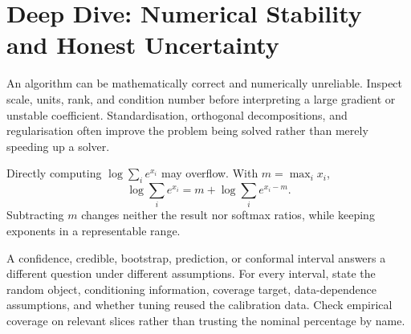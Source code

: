 \expandafter\def\csname almanachdeepdive@mathematics\endcsname{%
\section{Deep Dive: Numerical Stability and Honest Uncertainty}
\begin{tcbitemize}[skin=sectionraster]
\tcbitem[title={Conditioning Before Optimisation},raster multicolumn=3]
An algorithm can be mathematically correct and numerically unreliable.
Inspect scale, units, rank, and condition number before interpreting a large
gradient or unstable coefficient.
Standardisation, orthogonal decompositions, and regularisation often improve
the problem being solved rather than merely speeding up a solver.

\tcbitem[title={Log-Sum-Exp},raster multicolumn=3]
Directly computing $\log\sum_i e^{x_i}$ may overflow.
With $m=\max_i x_i$,
\begin{equation}
  \log\sum_i e^{x_i}=m+\log\sum_i e^{x_i-m}.
\end{equation}
Subtracting $m$ changes neither the result nor softmax ratios, while keeping
exponents in a representable range.

\tcbitem[title={Intervals Need Assumptions},raster multicolumn=6]
A confidence, credible, bootstrap, prediction, or conformal interval answers a
different question under different assumptions.
For every interval, state the random object, conditioning information,
coverage target, data-dependence assumptions, and whether tuning reused the
calibration data.
Check empirical coverage on relevant slices rather than trusting the nominal
percentage by name.
\end{tcbitemize}
}

